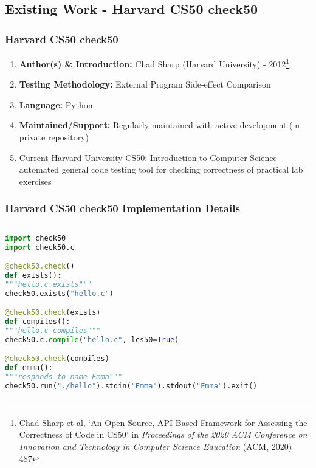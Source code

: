 \documentclass[xcolor]{beamer}
\begin{document}
\subsection{Existing Work - Harvard CS50 check50}
\begin{frame}
	\frametitle{Harvard CS50 check50}
	\begin{enumerate}
		\setlength\itemsep{1em}
		\item \textbf{Author(s) \& Introduction:} Chad Sharp (Harvard University) - 2012\footnote{Chad Sharp et al, ‘An Open-Source, API-Based Framework for Assessing the Correctness of Code in CS50’ in \textit{Proceedings of the 2020 ACM Conference on Innovation and Technology in Computer Science Education} (ACM, 2020) 487}
			\pause
		\item \textbf{Testing Methodology:} External Program Side-effect Comparison 
			\pause
		\item \textbf{Language:} Python
			\pause
		\item \textbf{Maintained/Support:} Regularly maintained with active development (in private repository)
			\pause 
		\item Current Harvard University CS50: Introduction to Computer Science automated general code testing tool for checking correctness of practical lab exercises
	\end{enumerate}
\end{frame}
\begin{frame}[fragile]
	\frametitle{Harvard CS50 check50 Implementation Details}
	\begin{columns}
		\begin{column}{0.55\textwidth}
			\centering		
\begin{lstlisting}[language=python, breaklines=true, caption={check50 tests}]
import check50
import check50.c

@check50.check()
def exists():
"""hello.c exists"""
check50.exists("hello.c")

@check50.check(exists)
def compiles():
"""hello.c compiles"""
check50.c.compile("hello.c", lcs50=True)

@check50.check(compiles)
def emma():
"""responds to name Emma"""
check50.run("./hello").stdin("Emma").stdout("Emma").exit()
\end{lstlisting}
		\end{column}
		\begin{column}{0.35\textwidth}
			\centering
		\end{column}
	\end{columns}
\end{frame}
\end{document}
